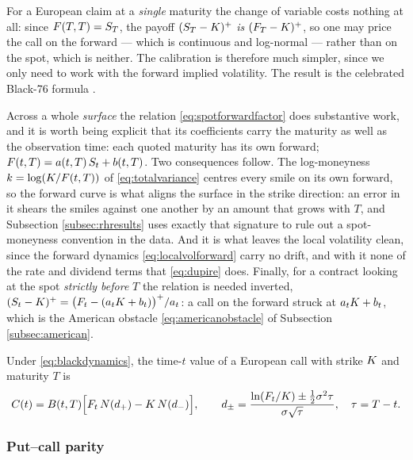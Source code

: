 For a European claim at a \emph{single} maturity the change of variable costs nothing at all: since
$F(T,T)=S_T$, the payoff $(S_T-K)^+$ \emph{is} $(F_T-K)^+$, so one may price
the call on the forward --- which is continuous and log-normal --- rather than on the spot, which is
neither. The calibration is therefore much simpler, since we only need to work with the forward
implied volatility. The result is the celebrated Black-76 formula \cite{black1976}.

Across a whole \emph{surface} the relation \eqref{eq:spotforwardfactor} does substantive work, and it
is worth being explicit that its coefficients carry the maturity as well as the observation time:
each quoted maturity has its own forward; $F(t,T)=a(t,T)\,S_t+b(t,T)$. Two consequences follow. The log-moneyness
$k=\log(K/F(t,T))$ of \eqref{eq:totalvariance} centres every smile on its
own forward, so the forward curve is what aligns the surface in the strike direction: an error in it
shears the smiles against one another by an amount that grows with $T$, and Subsection
\ref{subsec:rhresults} uses exactly that signature to rule out a spot-moneyness convention in the
data. And it is what leaves the local volatility clean, since the forward dynamics
\eqref{eq:localvolforward} carry no drift, and with it none of the rate and dividend terms that
\eqref{eq:dupire} does. Finally, for a contract looking at the spot \emph{strictly before} $T$ the
relation is needed inverted, $(S_t-K)^+=\bigl(F_t-(a_tK+b_t)\bigr)^+/a_t$: a call
on the forward struck at $a_tK+b_t$, which is the American obstacle
\eqref{eq:americanobstacle} of Subsection \ref{subsec:american}.

\begin{proposition}\label{prop:black76}
Under \eqref{eq:blackdynamics}, the time-$t$ value of a European call with strike $K$ and 
maturity $T$ is
\begin{equation}\label{eq:black76}
C(t) = B(t,T)\Bigl[F_t\,N(d_+) - K\,N(d_-)\Bigr], \qquad 
d_\pm = \frac{\ln(F_t/K) \pm \tfrac12 \sigma^2\tau}{\sigma\sqrt{\tau}}, \quad \tau = T-t.
\end{equation}
\qedopen
\end{proposition}



\subsubsection*{Put--call parity}


